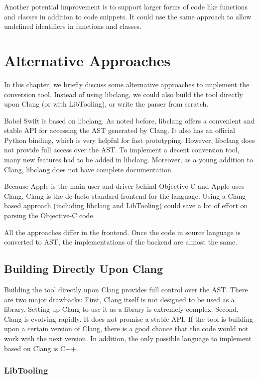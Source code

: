 \documentclass{sfuthesis}
\begin{document}
Another potential improvement is to support larger forms of code like functions and classes in addition to code snippets. It could use the same approach to allow undefined identifiers in functions and classes.

\chapter{Alternative Approaches}

In this chapter, we briefly discuss some alternative approaches to implement the conversion tool. Instead of using libclang, we could also build the tool directly upon Clang (or with LibTooling), or write the parser from scratch.

Babel Swift is based on libclang. As noted before, libclang offers a convenient and stable API for accessing the AST generated by Clang. It also has an official Python binding, which is very helpful for fast prototyping. However, libclang does not provide full access over the AST. To implement a decent conversion tool, many new features had to be added in libclang. Moreover, as a young addition to Clang, libclang does not have complete documentation.

Because Apple is the main user and driver behind Objective-C and Apple uses Clang, Clang is the de facto standard frontend for the language. Using a Clang-based approach (including libclang and LibTooling) could save a lot of effort on parsing the Objective-C code.

All the approaches differ in the frontend. Once the code in source language is converted to AST, the implementations of the backend are almost the same.

\section{Building Directly Upon Clang}

Building the tool directly upon Clang provides full control over the AST. There are two major drawbacks: First, Clang itself is not designed to be used as a library. Setting up Clang to use it as a library is extremely complex. Second, Clang is evolving rapidly. It does not promise a stable API. If the tool is building upon a certain version of Clang, there is a good chance that the code would not work with the next version. In addition, the only possible language to implement based on Clang is C++.

\subsection{LibTooling}
\end{document}
